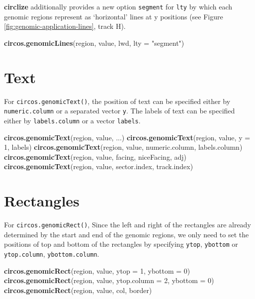 \documentclass[]{book}
\newenvironment{Shaded}{\begin{snugshade}}{\end{snugshade}}
\newcommand{\KeywordTok}[1]{\textcolor[rgb]{0.13,0.29,0.53}{\textbf{#1}}}
\newcommand{\DataTypeTok}[1]{\textcolor[rgb]{0.13,0.29,0.53}{#1}}
\newcommand{\DecValTok}[1]{\textcolor[rgb]{0.00,0.00,0.81}{#1}}
\newcommand{\StringTok}[1]{\textcolor[rgb]{0.31,0.60,0.02}{#1}}
\newcommand{\NormalTok}[1]{#1}
\theoremstyle{definition}
\theoremstyle{definition}
\theoremstyle{remark}
\begin{document}
\textbf{circlize} additionally provides a new option \texttt{segment}
for \texttt{lty} by which each genomic regions represent as `horizontal'
lines at y positions (see Figure \ref{fig:genomic-application-lines},
track H).

\begin{Shaded}
\begin{Highlighting}[]
\KeywordTok{circos.genomicLines}\NormalTok{(region, value, lwd, }\DataTypeTok{lty =} \StringTok{"segment"}\NormalTok{)}
\end{Highlighting}
\end{Shaded}

\section{Text}\label{genomic-text}

For \texttt{circos.genomicText()}, the position of text can be specified
either by \texttt{numeric.column} or a separated vector \texttt{y}. The
labels of text can be specified either by \texttt{labels.column} or a
vector \texttt{labels}.

\begin{Shaded}
\begin{Highlighting}[]
\KeywordTok{circos.genomicText}\NormalTok{(region, value, ...)}
\KeywordTok{circos.genomicText}\NormalTok{(region, value, }\DataTypeTok{y =} \DecValTok{1}\NormalTok{, labels)}
\KeywordTok{circos.genomicText}\NormalTok{(region, value, numeric.column, labels.column)}
\KeywordTok{circos.genomicText}\NormalTok{(region, value, facing, niceFacing, adj)}
\KeywordTok{circos.genomicText}\NormalTok{(region, value, sector.index, track.index)}
\end{Highlighting}
\end{Shaded}

\section{Rectangles}\label{genomic-rectangles}

For \texttt{circos.genomicRect()}, Since the left and right of the
rectangles are already determined by the start and end of the genomic
regions, we only need to set the positions of top and bottom of the
rectangles by specifying \texttt{ytop}, \texttt{ybottom} or
\texttt{ytop.column}, \texttt{ybottom.column}.

\begin{Shaded}
\begin{Highlighting}[]
\KeywordTok{circos.genomicRect}\NormalTok{(region, value, }\DataTypeTok{ytop =} \DecValTok{1}\NormalTok{, }\DataTypeTok{ybottom =} \DecValTok{0}\NormalTok{)}
\KeywordTok{circos.genomicRect}\NormalTok{(region, value, }\DataTypeTok{ytop.column =} \DecValTok{2}\NormalTok{, }\DataTypeTok{ybottom =} \DecValTok{0}\NormalTok{)}
\KeywordTok{circos.genomicRect}\NormalTok{(region, value, col, border)}
\end{Highlighting}
\end{Shaded}
\end{document}
